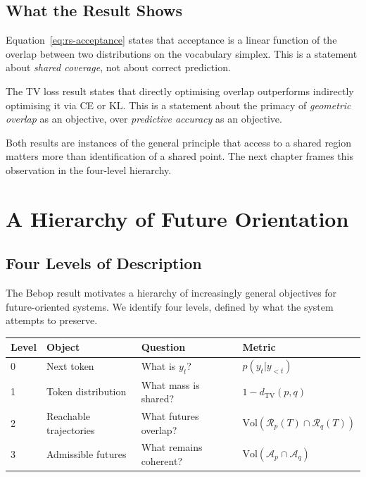 \documentclass[11pt, a4paper, openany]{book}
\theoremstyle{plain}
\theoremstyle{definition}
\theoremstyle{remark}
\newcommand{\TV}{d_{\mathrm{TV}}}
\newcommand{\Ap}{\mathcal{A}_p}
\newcommand{\Aq}{\mathcal{A}_q}
\newcommand{\Vol}{\mathrm{Vol}}
\begin{document}
\section{What the Result Shows}

Equation~\eqref{eq:rs-acceptance} states that acceptance is a linear function
of the overlap between two distributions on the vocabulary simplex.
This is a statement about \emph{shared coverage}, not about correct prediction.

The TV loss result states that directly optimising overlap outperforms
indirectly optimising it via CE or KL.
This is a statement about the primacy of \emph{geometric overlap} as an
objective, over \emph{predictive accuracy} as an objective.

Both results are instances of the general principle that access to a shared
region matters more than identification of a shared point.
The next chapter frames this observation in the four-level hierarchy.

\chapter{A Hierarchy of Future Orientation}
\label{ch:hierarchy}

\section{Four Levels of Description}

The Bebop result motivates a hierarchy of increasingly general objectives
for future-oriented systems.
We identify four levels, defined by what the system attempts to preserve.

\begin{center}
\begin{tabular}{llll}
\hline
\textbf{Level} & \textbf{Object} & \textbf{Question} & \textbf{Metric} \\
\hline
0 & Next token & What is $y_t$? & $p(y_t | y_{<t})$ \\
1 & Token distribution & What mass is shared? & $1 - \TV(p,q)$ \\
2 & Reachable trajectories & What futures overlap? & $\Vol(\mathcal{R}_p(T) \cap \mathcal{R}_q(T))$ \\
3 & Admissible futures & What remains coherent? & $\Vol(\Ap \cap \Aq)$ \\
\hline
\end{tabular}
\end{center}
\end{document}
